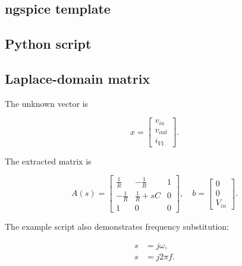 \documentclass[11pt,a4paper]{article}
\begin{document}


\subsection{ngspice template}



\subsection{Python script}



\subsection{Laplace-domain matrix}

The unknown vector is

\begin{equation}
    x =
    \begin{bmatrix}
        v_{in} \\
        v_{out} \\
        i_{V1}
    \end{bmatrix}.
\end{equation}

The extracted matrix is

\begin{equation}
    A(s) =
    \begin{bmatrix}
        \frac{1}{R} & -\frac{1}{R} & 1 \\
        -\frac{1}{R} & \frac{1}{R}+sC & 0 \\
        1 & 0 & 0
    \end{bmatrix},
    \quad
    b =
    \begin{bmatrix}
        0 \\
        0 \\
        V_{in}
    \end{bmatrix}.
\end{equation}

The example script also demonstrates frequency substitution:

\begin{align}
    s &= j\omega, \\
    s &= j2\pi f.
\end{align}
\end{document}
